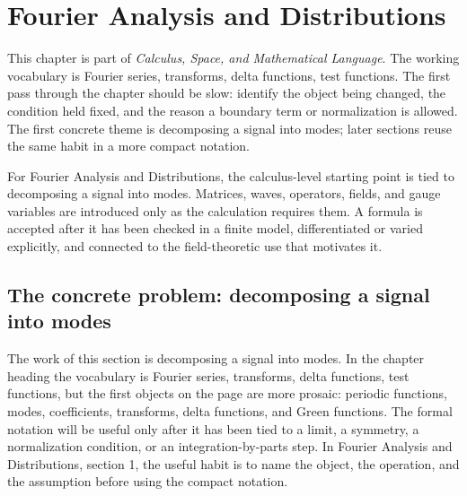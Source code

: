 \chapter{Fourier Analysis and Distributions}


This chapter is part of \emph{Calculus, Space, and Mathematical Language}.  The working vocabulary is Fourier series, transforms, delta functions, test functions.  The first pass through the chapter should be slow: identify the object being changed, the condition held fixed, and the reason a boundary term or normalization is allowed.  The first concrete theme is decomposing a signal into modes; later sections reuse the same habit in a more compact notation.

For Fourier Analysis and Distributions, the calculus-level starting point is tied to decomposing a signal into modes.  Matrices, waves, operators, fields, and gauge variables are introduced only as the calculation requires them.  A formula is accepted after it has been checked in a finite model, differentiated or varied explicitly, and connected to the field-theoretic use that motivates it.

\section{The concrete problem: decomposing a signal into modes}













The work of this section is decomposing a signal into modes.  In the chapter heading the vocabulary is Fourier series, transforms, delta functions, test functions, but the first objects on the page are more prosaic: periodic functions, modes, coefficients, transforms, delta functions, and Green functions.  The formal notation will be useful only after it has been tied to a limit, a symmetry, a normalization condition, or an integration-by-parts step.  In Fourier Analysis and Distributions, section 1, the useful habit is to name the object, the operation, and the assumption before using the compact notation.

